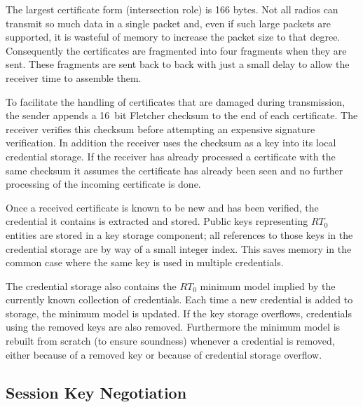 The largest certificate form (intersection role) is 166 bytes. Not all radios can transmit so
much data in a single packet and, even if such large packets are supported, it is wasteful of
memory to increase the packet size to that degree. Consequently the certificates are fragmented
into four fragments when they are sent. These fragments are sent back to back with just a small
delay to allow the receiver time to assemble them. 

To facilitate the handling of certificates that are damaged during transmission, the sender
appends a 16~bit Fletcher checksum to the end of each certificate. The receiver verifies this
checksum before attempting an expensive signature verification. In addition the receiver uses
the checksum as a key into its local credential storage. If the receiver has already processed
a certificate with the same checksum it assumes the certificate has already been seen and no
further processing of the incoming certificate is done.

Once a received certificate is known to be new and has been verified, the credential it contains
is extracted and stored. Public keys representing $RT_0$ entities are stored in a key storage
component; all references to those keys in the credential storage are by way of a small integer
index. This saves memory in the common case where the same key is used in multiple credentials.

The credential storage also contains the $RT_0$ minimum model implied by the currently known
collection of credentials.  Each time a new credential is added to
storage, the minimum model is updated. If the key storage overflows, credentials using the
removed keys are also removed. Furthermore the minimum model is rebuilt from scratch (to ensure
soundness) whenever a credential is removed, either because of a removed key or because of
credential storage overflow.

\subsection{Session Key Negotiation}

